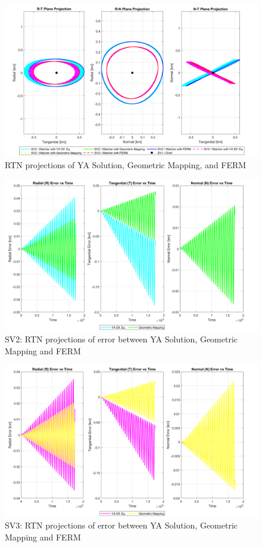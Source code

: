 \begin{figure}[H]
    \centering
    \includegraphics[width=0.7\linewidth]{sim/figures/PS3/RTN_projections_YA_comparison.png}
    \caption{RTN projections of YA Solution, Geometric Mapping, and FERM}
    \label{fig:RTN_YA_comp}
\end{figure}
\begin{figure}[H]
    \centering
    \includegraphics[width=0.7\linewidth]{sim/figures/PS3/RTN_error_over_time_YA_comparison_SV2.png}
    \caption{SV2: RTN projections of error between YA Solution, Geometric Mapping and FERM}
    \label{fig:RTN_error_comp_SV2}
\end{figure}
\begin{figure}[H]
    \centering
    \includegraphics[width=0.7\linewidth]{sim/figures/PS3/RTN_error_over_time_YA_comparison_SV3.png}
    \caption{SV3: RTN projections of error between YA Solution, Geometric Mapping and FERM}
    \label{fig:RTN_error_comp_SV3}
\end{figure}

